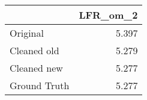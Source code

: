 \begin{tabular}{lr}
\toprule
{} & LFR_om_2 \\
\midrule
Original     &    5.397 \\
Cleaned old  &    5.279 \\
Cleaned new  &    5.277 \\
Ground Truth &    5.277 \\
\bottomrule
\end{tabular}
